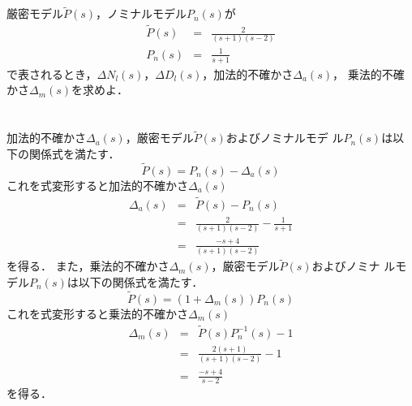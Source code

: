\documentclass[a4paper,12pt]{jarticle}
\begin{document}
%
\title{\vspace{-30mm} }
\date{}
%
\maketitle
%
\vspace{-30mm}
%
\section*{}
厳密モデル$\tilde{P}(s)$，ノミナルモデル$P_n(s)$が
%
\begin{eqnarray}
 \tilde{P}(s)&=&\frac{2}{(s+1)(s-2)} \\
 P_n(s)&=&\frac{1}{s+1}
\end{eqnarray}
%
で表されるとき，$\Delta N_l(s)$，$\Delta D_l(s)$，加法的不確かさ$\Delta_a(s)$，
乗法的不確かさ$\Delta_m(s)$を求めよ．
\vspace{-10mm}
\section*{}
加法的不確かさ$\Delta_a(s)$，厳密モデル$\tilde{P}(s)$およびノミナルモデ
ル$P_n(s)$は以下の関係式を満たす．
%
\begin{equation}
 \tilde{P}(s)=P_n(s)-\Delta_a(s)
\end{equation}
%
これを式変形すると加法的不確かさ$\Delta_a(s)$
%
\begin{eqnarray}
 \Delta_a(s) &=& \tilde{P}(s)-P_n(s) \nonumber \\
  &=& \frac{2}{(s+1)(s-2)}-\frac{1}{s+1} \nonumber \\
 &=& \frac{-s+4}{(s+1)(s-2)} 
\end{eqnarray}
%
を得る．
%
また，乗法的不確かさ$\Delta_m(s)$，厳密モデル$\tilde{P}(s)$およびノミナ
ルモデル$P_n(s)$は以下の関係式を満たす．
%
\begin{equation}
\tilde{P}(s) = (1+\Delta_m(s))P_n(s) 
\end{equation}
%
これを式変形すると乗法的不確かさ$\Delta_m(s)$
%
\begin{eqnarray}
 \Delta_m(s) &=& \tilde{P}(s)P_n^{-1}(s)-1 \\
 &=&\frac{2(s+1)}{(s+1)(s-2)}-1 \\
 &=&\frac{-s+4}{s-2}
\end{eqnarray}
%
を得る．
\end{document}
